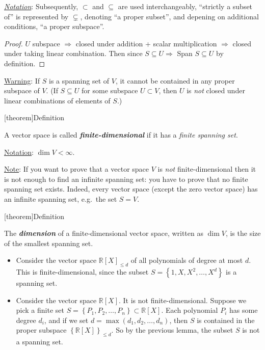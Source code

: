 \documentclass[12pt]{report}
\theoremstyle{definition}
\begin{document}
\emph{\underline{Notation}}: Subsequently, $\subset$ and $\subseteq$ are used interchangeably,
``strictly a subset of'' is represented by $\subsetneq$,
denoting ``a proper subset'', and depening on additional conditions,
``a proper subspace''.

\begin{proof}
    $U$ subspace $\Rightarrow{}$ closed under addition + scalar multiplication
    $\Rightarrow{}$ closed under taking linear combination.
    Then since $S \subseteq U \Rightarrow{}$ Span $S \subseteq U$ by definition.
\end{proof}

\underline{Warning}: If $S$ is a spanning set of $V$, it cannot be contained 
in any proper subspace of $V$.
(If $S \subseteq U$ for some subspace $U \subset V$, 
then $U$ is \emph{not} closed under linear combinations of elements of $S$.)

[theorem]{Definition}
\begin{finite spanning set}
    A vector space is called \textbf{\emph{finite-dimensional}} if it has a \emph{finite spanning set}.
\end{finite spanning set}

\underline{Notation}: $\dim{V} < \infty$.

\underline{Note}: If you want to prove that a vector space $V$ is \emph{not} finite-dimensional
then it is not enough to find an infinite spanning set: you have to prove that no finite spanning set exists.
Indeed, every vector space (except the zero vector space) has an infinite spanning set, 
e.g.\ the set $S = V$.

[theorem]{Definition}
\begin{dimension def}
    The \textbf{\emph{dimension}} of a finite-dimensional vector space,
    written as $\dim{V}$,
    is the size of the smallest spanning set.
\end{dimension def}

\begin{ex}
    \begin{itemize}
        \,

            \item 
    Consider the vector space ${\mathbb{R}[X]}_{\le d}$ of all polynomials of degree at most $d$.
    This is finite-dimensional, since the subset $S = \left\{1, X, X^{2},\ldots,X^{d}\right\} $
    is a spanning set.
\item Consider the vector space $\mathbb{R}[X]$. It is not finite-dimensional.
    Suppose we pick a finite set $S = \left\{P_1,P_2,\ldots,P_n\right\} \subset \mathbb{R}[X]$.
    Each polynomial $P_i$ has some degree $d_i$, and if we set $d = \max{(d_1, d_2,\ldots,d_n)}$,
    then $S$ is contained in the proper subspace ${\left\{\mathbb{R}[X]\right\}}_{\le d}$.
    So by the previous lemma, the subset $S$ is not a spanning set.
    \end{itemize}
    
\end{ex}
\end{document}
